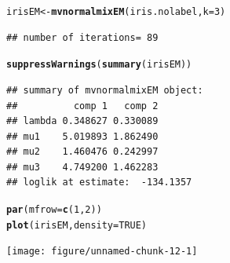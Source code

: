\documentclass{article}\usepackage[]{graphicx}\usepackage[]{xcolor}
\makeatletter
\newcommand{\hlnum}[1]{\textcolor[rgb]{0.686,0.059,0.569}{#1}}%
\newcommand{\hlstd}[1]{\textcolor[rgb]{0.345,0.345,0.345}{#1}}%
\newcommand{\hlkwb}[1]{\textcolor[rgb]{0.69,0.353,0.396}{#1}}%
\newcommand{\hlkwc}[1]{\textcolor[rgb]{0.333,0.667,0.333}{#1}}%
\newcommand{\hlkwd}[1]{\textcolor[rgb]{0.737,0.353,0.396}{\textbf{#1}}}%
\newenvironment{kframe}{%
 \def\at@end@of@kframe{}%
 \ifinner\ifhmode%
  \def\at@end@of@kframe{\end{minipage}}%
  \begin{minipage}{\columnwidth}%
 \fi\fi%
 \def\FrameCommand##1{\hskip\@totalleftmargin \hskip-\fboxsep
 \colorbox{shadecolor}{##1}\hskip-\fboxsep
     \hskip-\linewidth \hskip-\@totalleftmargin \hskip\columnwidth}%
 \MakeFramed {\advance\hsize-\width
   \@totalleftmargin\z@ \linewidth\hsize
   \@setminipage}}%
 {\par\unskip\endMakeFramed%
 \at@end@of@kframe}
\newenvironment{knitrout}{}{} %
\theoremstyle{plain}
\theoremstyle{definition}
\theoremstyle{remark}
\makeatother
\begin{document}
\begin{knitrout}
\color{fgcolor}\begin{kframe}
\begin{alltt}
  \hlstd{irisEM} \hlkwb{<-} \hlkwd{mvnormalmixEM}\hlstd{(iris.nolabel,} \hlkwc{k}\hlstd{=}\hlnum{3}\hlstd{)}
\end{alltt}
\begin{verbatim}
## number of iterations= 89
\end{verbatim}
\begin{alltt}
  \hlkwd{suppressWarnings}\hlstd{(}\hlkwd{summary}\hlstd{(irisEM))}
\end{alltt}
\begin{verbatim}
## summary of mvnormalmixEM object:
##          comp 1   comp 2
## lambda 0.348627 0.330089
## mu1    5.019893 1.862490
## mu2    1.460476 0.242997
## mu3    4.749200 1.462283
## loglik at estimate:  -134.1357
\end{verbatim}
\begin{alltt}
  \hlkwd{par}\hlstd{(}\hlkwc{mfrow}\hlstd{=}\hlkwd{c}\hlstd{(}\hlnum{1}\hlstd{,}\hlnum{2}\hlstd{))}
  \hlkwd{plot}\hlstd{(irisEM,} \hlkwc{density}\hlstd{=}\hlnum{TRUE}\hlstd{)}
\end{alltt}
\end{kframe}

{\centering \texttt{[image: figure/unnamed-chunk-12-1]} 

}


\end{knitrout}
\end{document}
